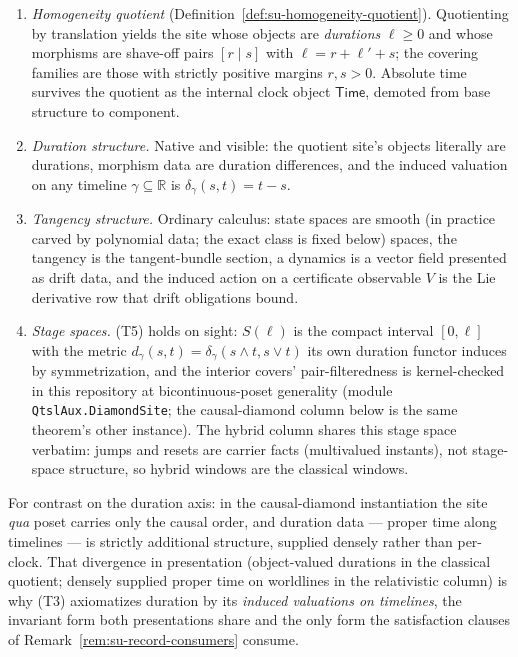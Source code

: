 \begin{remark}
\begin{enumerate}
\item \emph{Homogeneity quotient}
  (Definition~\ref{def:su-homogeneity-quotient}). Quotienting by translation yields
  the site whose objects are \emph{durations} $\ell \ge 0$ and whose
  morphisms are shave-off pairs $[r \mid s]$ with
  $\ell = r + \ell' + s$; the covering families are those with
  strictly positive margins $r, s > 0$. Absolute time survives the
  quotient as the internal clock object $\mathsf{Time}$, demoted
  from base structure to component.
\item \emph{Duration structure.} Native and visible: the quotient
  site's objects literally are durations, morphism data are duration
  differences, and the induced valuation on any timeline
  $\gamma \subseteq \mathbb{R}$ is $\delta_\gamma(s,t) = t - s$.
\item \emph{Tangency structure.} Ordinary calculus: state spaces are
  smooth (in practice carved by polynomial data; the exact class is
  fixed below) spaces, the tangency is the tangent-bundle section,
  a dynamics is a vector field presented as drift data, and the
  induced action on a certificate observable $V$ is the Lie
  derivative row that drift obligations bound.
\item \emph{Stage spaces.} (T5) holds on sight: $S(\ell)$ is the
  compact interval $[0,\ell]$ with the metric
  $d_\gamma(s,t) = \delta_\gamma(s \wedge t, s \vee t)$ its own
  duration functor induces by symmetrization, and the interior covers'
  pair-filteredness is kernel-checked in this repository at
  bicontinuous-poset generality (module \texttt{QtslAux.DiamondSite};
  the causal-diamond column below is the same theorem's other
  instance). The hybrid column shares this stage space verbatim:
  jumps and resets are carrier facts (multivalued instants), not
  stage-space structure, so hybrid windows are the classical
  windows.
\end{enumerate}
For contrast on the duration axis: in the causal-diamond
instantiation the site \emph{qua} poset carries only the causal
order, and duration data --- proper time along timelines --- is
strictly additional structure, supplied densely rather than
per-clock. That divergence in presentation (object-valued durations
in the classical quotient; densely supplied proper time on
worldlines in the relativistic column) is why (T3) axiomatizes
duration by its \emph{induced valuations on timelines}, the invariant
form both presentations share and the only form the satisfaction
clauses of Remark~\ref{rem:su-record-consumers} consume.
\end{remark}

